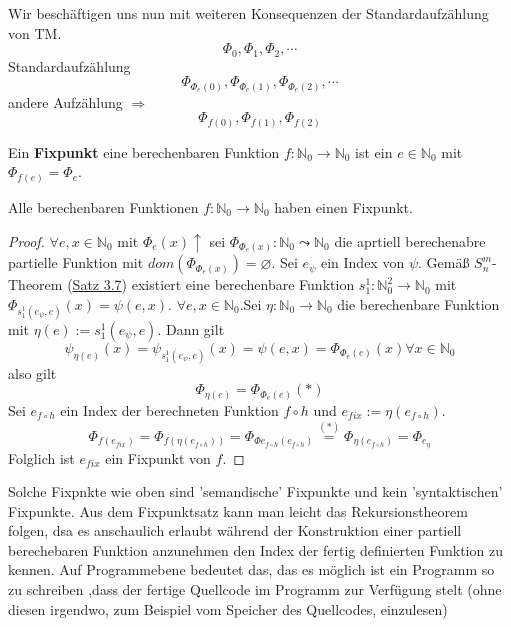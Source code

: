     Wir beschäftigen uns nun mit weiteren Konsequenzen der Standardaufzählung von TM. 
    \[
      \Phi_0, \Phi_1, \Phi_2, \cdots
    \]
    Standardaufzählung 
    \[
      \Phi_{\Phi_e(0)}, \Phi_{\Phi_e(1)}, \Phi_{\Phi_e(2)}, \cdots
    \]
    andere Aufzählung \(\Rightarrow\) 
    \[
      \Phi_{f(0)}, \Phi_{f(1)}, \Phi_{f(2)}
    \]

    Ein \textbf{Fixpunkt} eine berechenbaren Funktion \(f: \mathbb{N}_0 \to \mathbb{N}_0\) ist ein \(e \in \mathbb{N}_0\) mit \(\Phi_{f(e)} = \Phi_e\).

    Alle berechenbaren Funktionen \(f : \mathbb{N}_0 \to \mathbb{N}_0\) haben einen Fixpunkt.
    \begin{proof}
      \(\forall e, x \in \mathbb{N}_0\) mit \(\Phi_e(x) \uparrow\) sei \(\Phi_{\Phi_e(x)} : \mathbb{N}_0 \leadsto \mathbb{N}_0\) die aprtiell berechenabre partielle Funktion mit \(dom(\Phi_{\Phi_e(x)}) = \varnothing\). Sei \(e_{\psi}\) ein Index von \(\psi\). Gemäß \(S_n^m\)-Theorem (\hyperref[subsec:3.16]{Satz 3.7}) existiert eine berechenbare Funktion \(s_1^1 : \mathbb{N}_0^2 \to \mathbb{N}_0\) mit \(\Phi_{s_1^1(e_{\psi}, e)}(x) = \psi(e, x)\). \(\forall e, x \in \mathbb{N}_0\).Sei \(\eta : \mathbb{N}_0 \to \mathbb{N}_0\) die berechenbare Funktion mit \(\eta (e) := s_1^1(e_{\psi}, e)\). Dann gilt 
      \[
        \psi_{\eta(e)}(x) = \psi_{s_1^1(e_{\psi}, e)}(x) = \psi(e, x) = \Phi_{\Phi_e(e)}(x) \forall x \in \mathbb{N}_0
      \]
      also gilt 
      \[
        \Phi_{\eta(e)} = \Phi_{\Phi_e (e)} (*)
      \]
      Sei \(e_{f \circ h}\) ein Index der berechneten Funktion \(f \circ h\) und \(e_{fix} := \eta(e_{f\circ h})\). 
      \[
        \Phi_{f(e_{fix})} = \Phi_{f(\eta(e_{f \circ h}))} = \Phi_{\Phi{e_{f\circ h}} (e_{f\circ h})} \overset{(*)}{=} \Phi_{\eta(e_{f \circ h})} = \Phi_{e_\eta}
      \] Folglich ist \(e_{fix}\) ein Fixpunkt von \(f\). 
    \end{proof}
    Solche Fixpnkte wie oben sind 'semandische' Fixpunkte und kein 'syntaktischen' Fixpunkte. Aus dem Fixpunktsatz kann man leicht das Rekursionstheorem folgen, dsa es anschaulich erlaubt während der Konstruktion einer partiell berechebaren Funktion anzunehmen den Index der fertig definierten Funktion zu kennen. Auf Programmebene bedeutet das, das es möglich ist ein Programm so zu schreiben ,dass der fertige Quellcode im Programm zur Verfügung stelt (ohne diesen irgendwo, zum Beispiel vom Speicher des Quellcodes, einzulesen)

